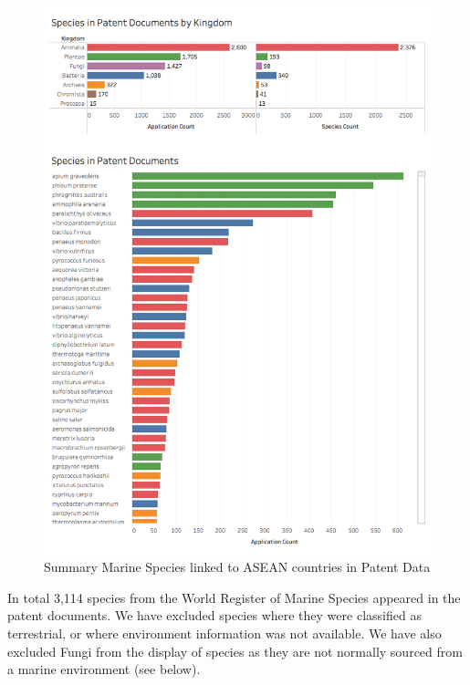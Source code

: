\documentclass[]{book}
\theoremstyle{definition}
\theoremstyle{definition}
\theoremstyle{definition}
\theoremstyle{remark}
\begin{document}
\begin{figure}

{\centering \includegraphics[width=1\linewidth]{images-patents/patent_species_dashboard} 

}

\caption{Summary Marine Species linked to ASEAN countries in Patent Data}\label{fig:patentspecies}
\end{figure}

In total 3,114 species from the World Register of Marine Species
appeared in the patent documents. We have excluded species where they
were classified as terrestrial, or where environment information was not
available. We have also excluded Fungi from the display of species as
they are not normally sourced from a marine environment (see below).
\end{document}
